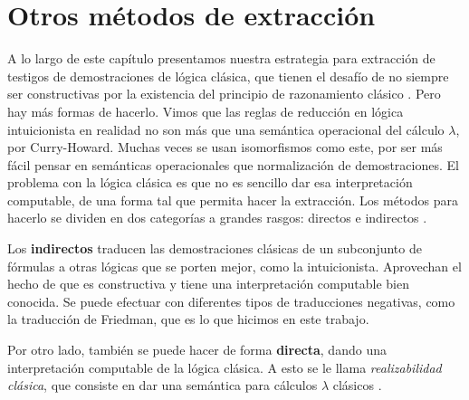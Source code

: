 \section{Otros métodos de extracción}

A lo largo de este capítulo presentamos nuestra estrategia para extracción de testigos de demostraciones de lógica clásica, que tienen el desafío de no siempre ser constructivas por la existencia del principio de razonamiento clásico . Pero hay más formas de hacerlo.
Vimos que las reglas de reducción en lógica intuicionista en realidad no son más que una semántica operacional del cálculo $\lambda$, por Curry-Howard. Muchas veces se usan isomorfismos como este, por ser más fácil pensar en semánticas operacionales que normalización de demostraciones. El problema con la lógica clásica es que no es sencillo dar esa interpretación computable, de una forma tal que permita hacer la extracción. Los métodos para hacerlo se dividen en dos categorías a grandes rasgos: directos e indirectos \cite{miquel-friedman}.

Los \textbf{indirectos} traducen las demostraciones clásicas de un subconjunto de fórmulas a otras lógicas que se porten mejor, como la intuicionista. Aprovechan el hecho de que es constructiva y tiene una interpretación computable bien conocida. Se puede efectuar con diferentes tipos de traducciones negativas, como la traducción de Friedman, que es lo que hicimos en este trabajo.

Por otro lado, también se puede hacer de forma \textbf{directa}, dando una interpretación computable de la lógica clásica. A esto se le llama \textit{realizabilidad clásica}, que consiste en dar una semántica para cálculos $\lambda$ clásicos \cite{miquel-classical-realiz}.